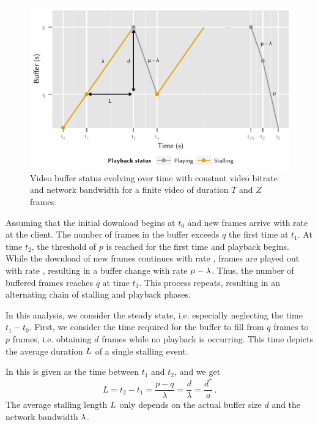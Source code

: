 \begin{figure}
  \centering
  \includegraphics{application/qoe_user_behaviour/system_model/figures/player}
  \caption{Video buffer status evolving over time with constant video bitrate and network bandwidth for a finite video of duration \(T\) and \(Z\) frames.}
  \label{fig:application:qoe_user_behaviour:system_model:steady_state:player}
\end{figure}

Assuming that the initial download begins at \(t_0\) and new frames arrive with rate \networkBandwidth at the client.
The number of frames in the buffer \currentNumberFrames exceeds \(q\) the first time at \(t_1\).
At time \(t_2\), the threshold of \(p\) is reached for the first time and playback begins.
While the download of new frames continues with rate \networkBandwidth, frames are played out with rate \playbackRate, resulting in a buffer change with rate \(\mu - \lambda\).
Thus, the number of buffered frames \currentNumberFrames reaches \(q\) at time \(t_3\).
This process repeats, resulting in an alternating chain of stalling and playback phases.

In this analysis, we consider the steady state, i.e. especially neglecting the time \(t_1 - t_0\).
First, we consider the time required for the buffer to fill from \(q\) frames to \(p\) frames, i.e. obtaining \(d\) frames while no playback is occurring.
This time depicts the average duration \(L\) of a single stalling event.

In  this is given as the time between \(t_1\) and \(t_2\), and we get
\begin{equation*}
L=t_2-t_1 = \frac{p-q}{\lambda}=\frac{d}{\lambda} = \frac{d^*}{a}\, .
\end{equation*}
The average stalling length \(L\) only depends on the actual buffer size \(d\) and the network bandwidth \(\lambda\).

